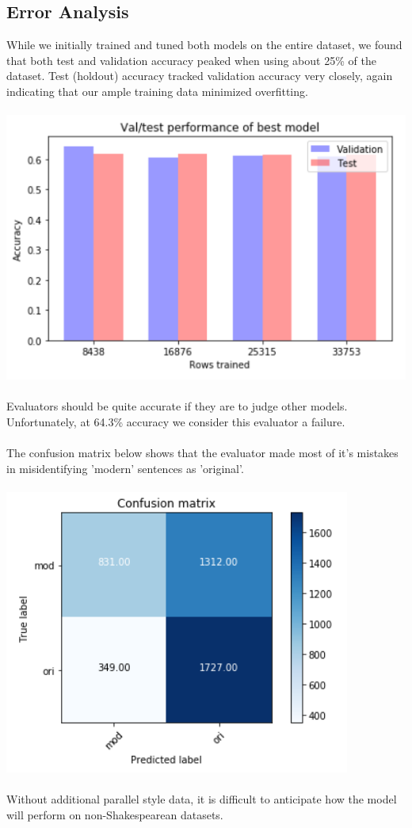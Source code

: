 \documentclass[letterpaper, 10 pt, conference]{ieeeconf}  %
\begin{document}
  \subsection{Error Analysis}
  While we initially trained and tuned both models on the entire dataset, we found that both test and validation accuracy peaked when using about 25\% of the dataset. Test (holdout) accuracy tracked validation accuracy very closely, again indicating that our ample training data minimized overfitting.
  \\
  \\
  \includegraphics[scale=.45]{performance.png}
  \\
  \\
  Evaluators should be quite accurate if they are to judge other models. Unfortunately, at 64.3\% accuracy we consider this evaluator a failure. \\
  \\
  The confusion matrix below shows that the evaluator made most of it's mistakes in misidentifying 'modern' sentences as 'original'. 
  \\
  \\
  \includegraphics[scale=.5]{confmat.png}
  \\
  \\
  Without additional parallel style data, it is difficult to anticipate how the model will perform on non-Shakespearean datasets.
\end{document}
